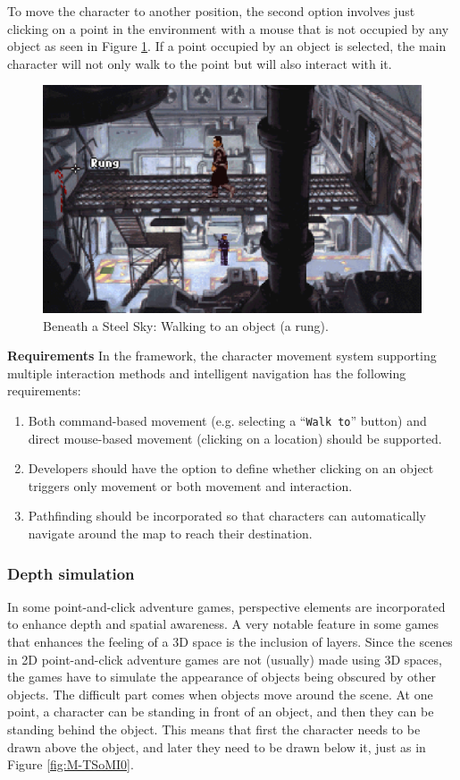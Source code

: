 To move the character to another position, the second option involves just clicking on a point in the environment with a mouse that is not occupied by any object as seen in Figure \ref{fig:M-BaSS}. If a point occupied by an object is selected, the main character will not only walk to the point but will also interact with it.

\begin{figure}[H]
\centering
\includegraphics[width=.8\linewidth]{img/M-BaSS.png}
\caption{Beneath a Steel Sky: Walking to an object (a rung).}
\label{fig:M-BaSS}
\end{figure}

\textbf{Requirements} \quad In the framework, the character movement system supporting multiple interaction methods and intelligent navigation has the following requirements:

\begin{enumerate}[label=\color{teal}\textbf{R{\arabic*}},resume]
  \item \label{intro:req:com+mouse_move} Both command-based movement (e.g. selecting a “\texttt{Walk to}” button) and direct mouse-based movement (clicking on a location) should be supported.
  \item \label{intro:req:mox_move} Developers should have the option to define whether clicking on an object triggers only movement or both movement and interaction.
  \item \label{intro:req:pathfinding}Pathfinding should be incorporated so that characters can automatically navigate around the map to reach their destination.
\end{enumerate}

\subsubsection{Depth simulation}
In some point-and-click adventure games, perspective elements are incorporated to enhance depth and spatial awareness. 
A very notable feature in some games that enhances the feeling of a 3D space is the inclusion of layers. Since the scenes in 2D point-and-click adventure games are not (usually) made using 3D spaces, the games have to simulate the appearance of objects being obscured by other objects. The difficult part comes when objects move around the scene. At one point, a character can be standing in front of an object, and then they can be standing behind the object. This means that first the character needs to be drawn above the object, and later they need to be drawn below it, just as in Figure \ref{fig:M-TSoMI0}.

